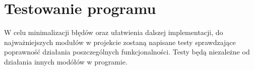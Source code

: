 \documentclass{article}
\begin{document}
\section{Testowanie programu}
{\fontsize{14}{14}\selectfont
W celu minimalizacji błędów oraz ułatwienia dalszej implementacji, do najważniejszych modułów w projekcie zostaną napisane testy sprawdzające poprawność działania poszczególnych funkcjonalności.
Testy będą niezależne od działania innych modółów w programie.}
\end{document}
